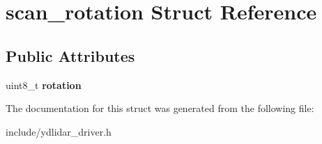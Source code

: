 \hypertarget{structscan__rotation}{}\section{scan\+\_\+rotation Struct Reference}
\label{structscan__rotation}
\subsection*{Public Attributes}
\begin{DoxyCompactItemize}
\item 
uint8\+\_\+t {\bfseries rotation}\hypertarget{structscan__rotation_a22cb3689e04952bbd07cdac97ecad4a0}{}\label{structscan__rotation_a22cb3689e04952bbd07cdac97ecad4a0}

\end{DoxyCompactItemize}


The documentation for this struct was generated from the following file\+:\begin{DoxyCompactItemize}
\item 
include/ydlidar\+\_\+driver.\+h\end{DoxyCompactItemize}
